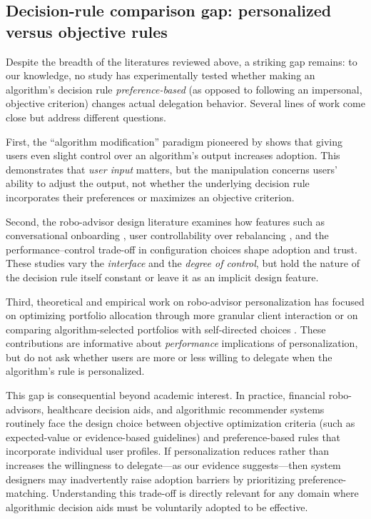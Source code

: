 \documentclass[a4paper, 12pt, fleqn]{article}
\theoremstyle{definition}
\begin{document}
\subsection{Decision-rule comparison gap: personalized versus objective rules}
Despite the breadth of the literatures reviewed above, a striking gap remains: to our knowledge, no study has experimentally tested whether making an algorithm's decision rule \emph{preference-based} (as opposed to following an impersonal, objective criterion) changes actual delegation behavior. Several lines of work come close but address different questions.

First, the ``algorithm modification'' paradigm pioneered by \citet{Dietvorst2018} shows that giving users even slight control over an algorithm's output increases adoption. This demonstrates that \emph{user input} matters, but the manipulation concerns users' ability to adjust the output, not whether the underlying decision rule incorporates their preferences or maximizes an objective criterion.

Second, the robo-advisor design literature examines how features such as conversational onboarding \citep{Hildebrand2021}, user controllability over rebalancing \citep{Kim2025ICIS}, and the performance--control trade-off in configuration choices \citep{Ruehr2020} shape adoption and trust. These studies vary the \emph{interface} and the \emph{degree of control}, but hold the nature of the decision rule itself constant or leave it as an implicit design feature.

Third, theoretical and empirical work on robo-advisor personalization has focused on optimizing portfolio allocation through more granular client interaction \citep{Capponi2022} or on comparing algorithm-selected portfolios with self-directed choices \citep{BouluReshef2026}. These contributions are informative about \emph{performance} implications of personalization, but do not ask whether users are more or less willing to delegate when the algorithm's rule is personalized.

This gap is consequential beyond academic interest. In practice, financial robo-advisors, healthcare decision aids, and algorithmic recommender systems routinely face the design choice between objective optimization criteria (such as expected-value or evidence-based guidelines) and preference-based rules that incorporate individual user profiles. If personalization reduces rather than increases the willingness to delegate---as our evidence suggests---then system designers may inadvertently raise adoption barriers by prioritizing preference-matching. Understanding this trade-off is directly relevant for any domain where algorithmic decision aids must be voluntarily adopted to be effective.
\end{document}
